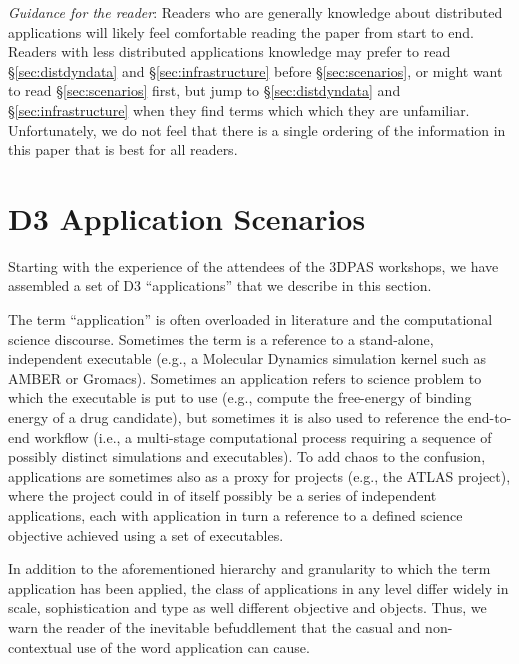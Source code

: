 \textit{Guidance for the reader}: Readers who are generally knowledge about distributed
applications will likely feel comfortable reading the paper from start to end.
Readers with less distributed applications knowledge may prefer to read
\S\ref{sec:distdyndata} and \S\ref{sec:infrastructure} before \S\ref{sec:scenarios},
or might want to read \S\ref{sec:scenarios} first, but jump to \S\ref{sec:distdyndata} and \S\ref{sec:infrastructure} when they find terms which which they are unfamiliar.
Unfortunately, we do not feel that there is a single ordering of the information in this
paper that is best for all readers.

\section{D3 Application Scenarios \label{sec:scenarios}}

Starting with the experience of the attendees of the 3DPAS workshops, we have
assembled a set of D3 ``applications'' that we describe in this section.  

The term ``application'' is often overloaded in literature and the computational
science discourse.  Sometimes the term is a reference to a stand-alone,
independent executable (e.g., a Molecular Dynamics simulation kernel such as
AMBER or Gromacs). Sometimes an application refers to science problem to which
the executable is put to use (e.g., compute the free-energy of binding energy of
a drug candidate), but sometimes it is also used to reference the end-to-end
workflow (i.e., a multi-stage computational process requiring a sequence of
possibly distinct simulations and executables).  To add chaos to the confusion,
applications are sometimes also as a proxy for projects (e.g., the ATLAS
project), where the project could in of itself possibly be a series of
independent applications, each with application in turn a reference to a defined
science objective achieved using a set of executables.

In addition to the aforementioned hierarchy and granularity to which the term
application has been applied, the class of applications in any level differ
widely in scale, sophistication and type as well different objective and
objects.  Thus, we warn the reader of the inevitable befuddlement that the
casual and non-contextual use of the word application can cause.



